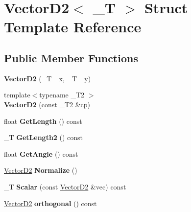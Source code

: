 \hypertarget{struct_vector_d2}{
\section{VectorD2$<$ \_\-T $>$ Struct Template Reference}
\label{struct_vector_d2}
}
\subsection*{Public Member Functions}
\begin{DoxyCompactItemize}
\item 
\hypertarget{struct_vector_d2_ac95a37507c713eacc24f85d0eeffb398}{
{\bfseries VectorD2} (\_\-T \_\-x, \_\-T \_\-y)}
\label{struct_vector_d2_ac95a37507c713eacc24f85d0eeffb398}

\item 
\hypertarget{struct_vector_d2_a7001fce01df0ac7d4f826a9067118214}{
{\footnotesize template$<$typename \_\-T2 $>$ }\\{\bfseries VectorD2} (const \_\-T2 \&cp)}
\label{struct_vector_d2_a7001fce01df0ac7d4f826a9067118214}

\item 
\hypertarget{struct_vector_d2_aacb0dd2f8ecf01d7ddca21cad846fd1d}{
float {\bfseries GetLength} () const }
\label{struct_vector_d2_aacb0dd2f8ecf01d7ddca21cad846fd1d}

\item 
\hypertarget{struct_vector_d2_af808a3130a0ade83ee61cb695a805ccd}{
\_\-T {\bfseries GetLength2} () const }
\label{struct_vector_d2_af808a3130a0ade83ee61cb695a805ccd}

\item 
\hypertarget{struct_vector_d2_abf5e9913d4095a0af3d70e843769e08b}{
float {\bfseries GetAngle} () const }
\label{struct_vector_d2_abf5e9913d4095a0af3d70e843769e08b}

\item 
\hypertarget{struct_vector_d2_a30895ee9911d00e6a77d89a0a0345a53}{
\hyperlink{struct_vector_d2}{VectorD2} {\bfseries Normalize} ()}
\label{struct_vector_d2_a30895ee9911d00e6a77d89a0a0345a53}

\item 
\hypertarget{struct_vector_d2_a3f21f9071e701aa7c1e60d01360c0ef0}{
\_\-T {\bfseries Scalar} (const \hyperlink{struct_vector_d2}{VectorD2} \&vec) const }
\label{struct_vector_d2_a3f21f9071e701aa7c1e60d01360c0ef0}

\item 
\hypertarget{struct_vector_d2_a79782fd91abc84fe0e52ef3123889134}{
\hyperlink{struct_vector_d2}{VectorD2} {\bfseries orthogonal} () const }
\label{struct_vector_d2_a79782fd91abc84fe0e52ef3123889134}


\end{DoxyCompactItemize}

